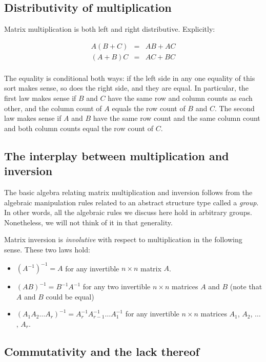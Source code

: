 \documentclass[10pt]{amsart}
\begin{document}
\subsection{Distributivity of multiplication}

Matrix multiplication is both left and right distributive. Explicitly:

\begin{eqnarray*}
  A(B + C) & = & AB + AC \\
  (A + B)C & = & AC + BC\\
\end{eqnarray*}

The equality is conditional both ways: if the left side in any one
equality of this sort makes sense, so does the right side, and they
are equal. In particular, the first law makes sense if $B$ and $C$
have the same row and column counts as each other, and the column
count of $A$ equals the row count of $B$ and $C$. The second law makes
sense if $A$ and $B$ have the same row count and the same column count
and both column counts equal the row count of $C$.

\subsection{The interplay between multiplication and inversion}

The basic algebra relating matrix multiplication and inversion follows
from the algebraic manipulation rules related to an abstract structure
type called a {\em group}. In other words, all the algebraic rules we
discuss here hold in arbitrary groups. Nonetheless, we will not think
of it in that generality.

Matrix inversion is {\em involutive} with respect to multiplication in
the following sense. These two laws hold:

\begin{itemize}
\item $(A^{-1})^{-1} = A$ for any invertible $n \times n$ matrix $A$.
\item $(AB)^{-1} = B^{-1}A^{-1}$ for any two invertible $n \times n$
  matrices $A$ and $B$ (note that $A$ and $B$ could be equal)
\item $(A_1A_2 \dots A_r)^{-1} = A_r^{-1}A_{r-1}^{-1} \dots A_1^{-1}$
  for any invertible $n \times n$ matrices $A_1$, $A_2$, $\dots$,
  $A_r$.
\end{itemize}

\subsection{Commutativity and the lack thereof}
\end{document}
